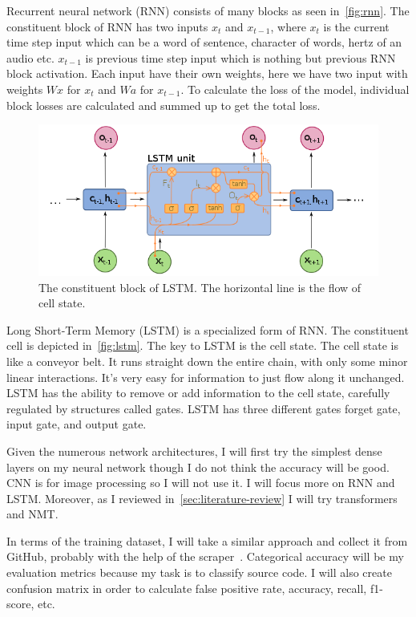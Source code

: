 Recurrent neural network (RNN) consists of many blocks as seen in~\autoref{fig:rnn}.
The constituent block of RNN has two inputs $x_t$ and $x_{t-1}$, where  $x_t$ is the current time step input which can be a word of sentence, character of words, hertz of an audio etc. $x_{t-1}$ is previous time step input which is nothing but previous RNN block activation. Each input have their own weights, here we have two input with weights $Wx$ for $x_t$ and $Wa$ for $x_{t-1}$.
To calculate the loss of the model, individual block losses are calculated and summed up to get the total loss.

\begin{figure}[ht]
\centering
\includegraphics[width=0.7\linewidth]{lstm-big}
\caption{The constituent block of LSTM. The horizontal line is the flow of cell state.}
\label{fig:lstm}
\end{figure}

Long Short-Term Memory (LSTM) is a specialized form of RNN. The constituent cell is depicted in~\autoref{fig:lstm}.
The key to LSTM is the cell state.
The cell state is like a conveyor belt. It runs straight down the entire chain, with only some minor linear interactions. It's very easy for information to just flow along it unchanged. LSTM has the ability to remove or add information to the cell state, carefully regulated by structures called gates.
LSTM has three different gates forget gate, input gate, and output gate.


Given the numerous network architectures, I will first try the simplest dense layers on my neural network though I do not think the accuracy will be good.
CNN is for image processing so I will not use it.
I will focus more on RNN and LSTM.
Moreover, as I reviewed in~\autoref{sec:literature-review} I will try transformers and NMT.


In terms of the training dataset, I will take a similar approach and collect it from GitHub, probably with the help of the scraper~\cite{alexandru2017replicating}.
Categorical accuracy will be my evaluation metrics because my task is to classify source code.
I will also create confusion matrix in order to calculate false positive rate, accuracy, recall, f1-score, etc.



